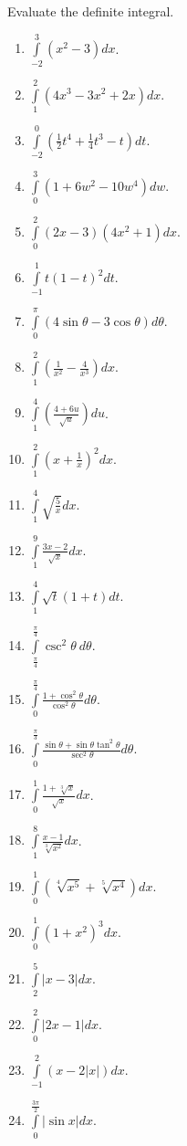 \begin{problem}
Evaluate the definite integral.
\begin{multicols}{3}
\begin{enumerate}
\item $\displaystyle \int\limits_{-2}^{3} (x^2-3) dx$.
\item $\displaystyle \int\limits_{1}^{2} (4x^3-3x^2+2x) dx$.
\item $\displaystyle \int\limits_{-2}^{0} \left(\frac{1}{2}t^4+\frac{1}{4}t^3-t \right) dt$.
\item $\displaystyle \int\limits_{0}^{3}(1+6w^2-10w^4) dw$.
\item $\displaystyle \int\limits_{0}^{2}(2x-3)(4x^2+1) dx$.
\item $\displaystyle \int\limits_{-1}^{1} t(1-t)^2 dt$.
\item $\displaystyle \int\limits_{0}^{\pi} (4\sin \theta -3 \cos \theta)d\theta$.
\item $\displaystyle \int\limits_{1}^{2}\left(\frac{1}{x^2}-\frac{4}{x^3}\right) dx$.
\item $\displaystyle \int\limits_{1}^{4}\left(\frac{4+6u}{\sqrt{u}}\right) du$.
\item $\displaystyle \int\limits_{1}^{2}\left(x+\frac{1}{x}\right)^2 dx$.
\item $\displaystyle \int\limits_{1}^{4}\sqrt{\frac{5}{x}} dx$.
\item $\displaystyle \int\limits_{1}^{9}\frac{3x-2}{\sqrt{x}} dx$.
\item $\displaystyle \int\limits_{1}^{4}\sqrt{t}(1+t) dt$.
\item $\displaystyle \int\limits_{\frac{\pi}{4}}^{\frac{\pi}{4}} \csc^2\theta ~d\theta$.
\item $\displaystyle \int\limits_{0}^{\frac{\pi}{4}}\frac{1+\cos^2\theta}{\cos^2\theta} d\theta$.
\item $\displaystyle \int\limits_{0}^{\frac{\pi}{3}} \frac{\sin \theta +\sin \theta \tan^2\theta}{\sec^2\theta}d\theta$.
\item $\displaystyle \int\limits_{0}^1 \frac{1+\sqrt[3]{x}}{\sqrt{x}}dx$.
\item $\displaystyle \int\limits_{1}^{8}\frac{x-1}{\sqrt[3]{x^2}} dx$.
\item $\displaystyle \int\limits_0^{1} (\sqrt[4]{x^5}+\sqrt[5]{x^4})dx $.
\item $\displaystyle \int\limits_{0}^{1}(1+x^2)^3 dx$.
\item $\displaystyle \int\limits_{2}^{5}|x-3| dx$.
\item $\displaystyle \int\limits_{0}^{2} |2x-1| dx$.
\item $\displaystyle \int\limits_{-1}^{2}(x-2|x|) dx$.
\item $\displaystyle \int\limits_{0}^{\frac{3\pi}{2}}|\sin x| dx$.
\end{enumerate}
\end{multicols}
\end{problem}
